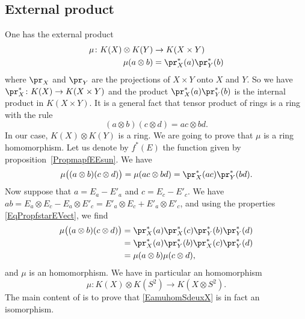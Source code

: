 					\subsection{External product}

One has the external product
\begin{equation}
\begin{aligned}
 \mu\colon K(X)\otimes K(Y)&\to K(X\times Y) \\
   \mu(a\otimes b)&= \pr_X^*(a)\pr^*_Y(b)
\end{aligned}
\end{equation}
where $\pr_X$ and $\pr_Y$ are the projections of $X\times Y$ onto $X$ and $Y$. So we have $\pr_X^*\colon K(X)\to K(X\times Y)$ and the product $\pr_X^*(a)\pr^*_Y(b) $ is the internal product in $K(X\times Y)$. It is a general fact that tensor product of rings is a ring with the rule
\begin{equation}
	(a\otimes b)(c\otimes d)=ac\otimes bd.
\end{equation}
In our case, $K(X)\otimes K(Y)$ is a ring. We are going to prove that $\mu$ is a ring homomorphism. Let us denote by $f^*(E)$ the function given by proposition~\ref{PropmapfEEsun}. We have
\[
  \mu\big( (a\otimes b)(c\otimes d) \big)=\mu(ac\otimes bd)=\pr^*_X(ac)\pr^*_Y(bd).
\]
Now suppose that $a=E_a-E'_a$ and $c=E_c-E'_c$. We have $ab=E_a\otimes E_c-E_a\otimes E'_c=E'_a\otimes E_c+E'_a\otimes E'_c$, and using the properties \eqref{EqPropfstarEVect}, we find
\begin{align*}
 \mu\big( (a\otimes b)(c\otimes d) \big)	&=\pr^*_X(a)\pr^*_X(c)\pr^*_Y(b)\pr^*_Y(d)\\
						&=\pr^*_X(a)\pr^*_Y(b)\pr^*_X(c)\pr^*_Y(d)\\
						&=\mu(a\otimes b)\mu(c\otimes d),
\end{align*}
and $\mu$ is an homomorphism. We have in particular an homomorphism
\begin{equation}		\label{EamuhomSdeuxX}
  \mu\colon K(X)\otimes K(S^2)\to K(X\otimes S^2).
\end{equation}
The main content of  is to prove that \eqref{EamuhomSdeuxX} is in fact an isomorphism.


